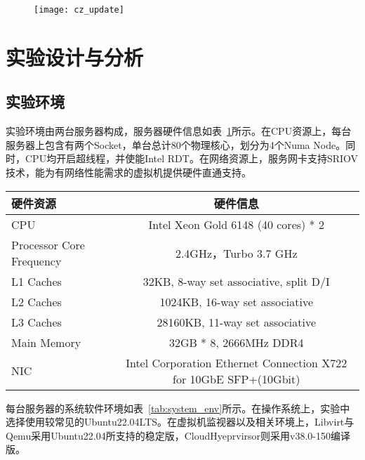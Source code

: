 \begin{figure}[H]
    \centering
    \texttt{[image: cz\_update]}
    \label{fig:cz_update}
\end{figure}

\section{实验设计与分析}

\subsection{实验环境}

实验环境由两台服务器构成，服务器硬件信息如表~\ref{tab:sandbox_exp_env}所示。在CPU资源上，每台服务器上包含有两个Socket，单台总计80个物理核心，划分为4个Numa Node。同时，CPU均开启超线程，并使能Intel RDT。在网络资源上，服务网卡支持SRIOV技术，能为有网络性能需求的虚拟机提供硬件直通支持。

\begin{table}[H]
    \label{tab:sandbox_exp_env}
    \footnotesize%
    \setlength{\tabcolsep}{4pt}%
    \renewcommand{\arraystretch}{1.25}%
    \centering
    \begin{tabular}{lc}
        \hline
        硬件资源 & 硬件信息 \\
        \hline
        CPU & Intel Xeon Gold 6148 (40 cores) * 2 \\
        Processor Core Frequency & 2.4GHz，Turbo 3.7 GHz \\
        L1 Caches & 32KB,  8-way set associative, split D/I \\
        L2 Caches & 1024KB, 16-way set associative \\
        L3 Caches & 28160KB, 11-way set associative \\
        Main Memory & 32GB * 8, 2666MHz DDR4 \\
        NIC & Intel Corporation Ethernet Connection X722 for 10GbE SFP+(10Gbit) \\
        \hline
    \end{tabular}
\end{table}

每台服务器的系统软件环境如表~\ref{tab:system_env}所示。在操作系统上，实验中选择使用较常见的Ubuntu22.04LTS。在虚拟机监视器以及相关环境上，Libvirt与Qemu采用Ubuntu22.04所支持的稳定版，CloudHyeprvirsor则采用v38.0-150编译版。

